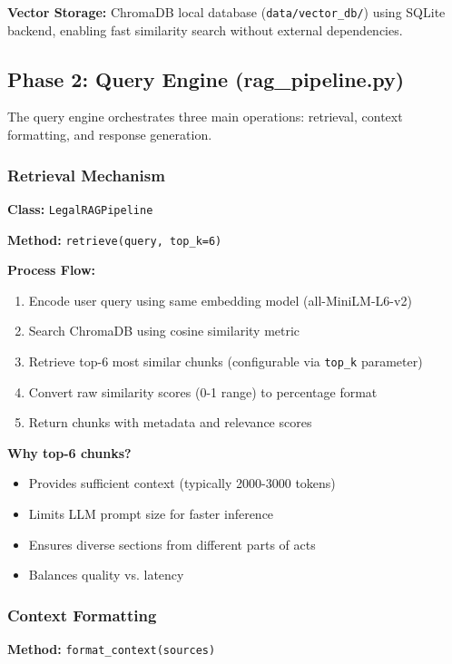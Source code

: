 \documentclass[12pt,a4paper]{article}
\begin{document}
\textbf{Vector Storage:} ChromaDB local database (\texttt{data/vector\_db/}) using SQLite backend, enabling fast similarity search without external dependencies.

\subsection{Phase 2: Query Engine (rag\_pipeline.py)}

The query engine orchestrates three main operations: retrieval, context formatting, and response generation.

\subsubsection{Retrieval Mechanism}

\textbf{Class:} \texttt{LegalRAGPipeline}

\textbf{Method:} \texttt{retrieve(query, top\_k=6)}

\textbf{Process Flow:}
\begin{enumerate}
    \item Encode user query using same embedding model (all-MiniLM-L6-v2)
    \item Search ChromaDB using cosine similarity metric
    \item Retrieve top-6 most similar chunks (configurable via \texttt{top\_k} parameter)
    \item Convert raw similarity scores (0-1 range) to percentage format
    \item Return chunks with metadata and relevance scores
\end{enumerate}

\textbf{Why top-6 chunks?}
\begin{itemize}
    \item Provides sufficient context (typically 2000-3000 tokens)
    \item Limits LLM prompt size for faster inference
    \item Ensures diverse sections from different parts of acts
    \item Balances quality vs. latency
\end{itemize}

\subsubsection{Context Formatting}

\textbf{Method:} \texttt{format\_context(sources)}
\end{document}
